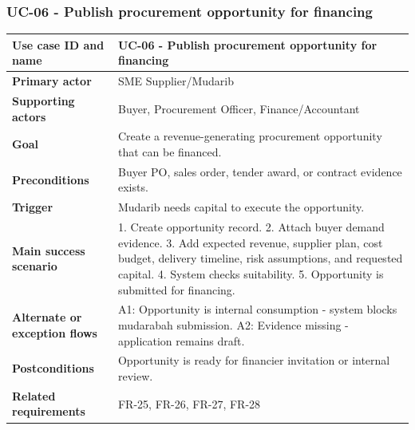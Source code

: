 \documentclass[11pt,a4paper]{article}
\begin{document}
\subsubsection{UC-06 - Publish procurement opportunity for financing}
\begin{footnotesize}
\begin{longtable}{@{}p{}p{}@{}}
\rowcolor{gray!10}\textbf{Use case ID and name} & UC-06 - Publish procurement opportunity for financing \\ \hline
\rowcolor{gray!10}\textbf{Primary actor} & SME Supplier/Mudarib \\ \hline
\rowcolor{gray!10}\textbf{Supporting actors} & Buyer, Procurement Officer, Finance/Accountant \\ \hline
\rowcolor{gray!10}\textbf{Goal} & Create a revenue-generating procurement opportunity that can be financed. \\ \hline
\rowcolor{gray!10}\textbf{Preconditions} & Buyer PO, sales order, tender award, or contract evidence exists. \\ \hline
\rowcolor{gray!10}\textbf{Trigger} & Mudarib needs capital to execute the opportunity. \\ \hline
\rowcolor{gray!10}\textbf{Main success scenario} & 1. Create opportunity record. 2. Attach buyer demand evidence. 3. Add expected revenue, supplier plan, cost budget, delivery timeline, risk assumptions, and requested capital. 4. System checks suitability. 5. Opportunity is submitted for financing. \\ \hline
\rowcolor{gray!10}\textbf{Alternate or exception flows} & A1: Opportunity is internal consumption - system blocks mudarabah submission. A2: Evidence missing - application remains draft. \\ \hline
\rowcolor{gray!10}\textbf{Postconditions} & Opportunity is ready for financier invitation or internal review. \\ \hline
\rowcolor{gray!10}\textbf{Related requirements} & FR-25, FR-26, FR-27, FR-28 \\ \hline
\end{longtable}
\end{footnotesize}
\end{document}
